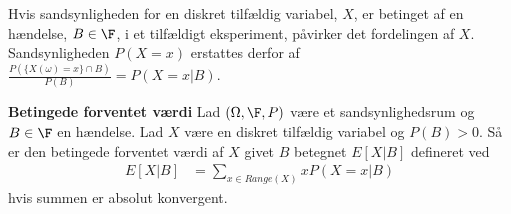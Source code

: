 



 






Hvis sandsynligheden for en diskret tilfældig variabel, $X$, er betinget af en hændelse, $B\in\F$, i et tilfældigt eksperiment, påvirker det fordelingen af $X$. Sandsynligheden $P(X=x)$ erstattes derfor af $\displaystyle\frac{P\left(\{X(\omega)=x\}\cap B\right)}{P(B)}=P(X=x|B)$.

\begin{minipage}\textwidth
\begin{defn}\textbf{Betingede forventet værdi}\label{def:betinget_forventet_værdi} %
\newline
Lad $(\Omega, \F, P)$ være et sandsynlighedsrum og $B\in\F$ en hændelse. Lad $X$ være en diskret tilfældig variabel og $P(B)>0$. Så er den betingede forventet værdi af $X$ givet $B$ betegnet $E[X|B]$ defineret ved 
\begin{align*}
    E[X|B]&=\sum_{x\in Range(X)}xP(X=x|B)
\end{align*}
hvis summen er absolut konvergent.
\end{defn}
\end{minipage}

